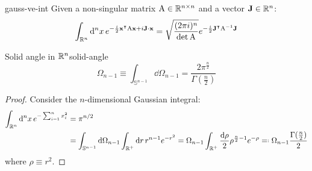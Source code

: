 \begin{lemma}{}{gauss-ve-int}
  Given a non-singular matrix $ \mathrm{A} \in \mathbb{R}^{n \times n} $ and a vector $ \mathbf{J} \in \mathbb{R}^n $:
  \begin{equation}
    \int_{\mathbb{R}^n} \mathrm{d}^nx\, e^{-\frac{i}{2} \mathbf{x}^\intercal \mathrm{A} \mathbf{x} + i \mathbf{J} \cdot \mathbf{x}} = \sqrt{\frac{(2\pi i)^n}{\det\mathrm{A}}} e^{-\frac{i}{2} \mathbf{J}^\intercal \mathrm{A}^{-1} \mathbf{J}}
  \end{equation}
\end{lemma}

\begin{proposition}[before upper = {\tcbtitle}]{Solid angle in $ \mathbb{R}^n $}{solid-angle}
  \begin{equation}
    \Omega_{n-1} \equiv \int_{\mathbb{S}^{n-1}} \dd \Omega_{n-1} = \frac{2\pi^{\frac{n}{2}}}{\Gamma(\frac{n}{2})}
    \label{eq:solid-angle}
  \end{equation}
\end{proposition}

\begin{proofbox}
  \begin{proof}
    Consider the $ n $-dimensional Gaussian integral:
    \begin{equation*}
      \begin{split}
        \int_{\R^n} \dd^nx \, e^{- \sum_{i = 1}^n x_i^2}
        & = \pi^{n/2} \\
        & = \int_{\mathbb{S}^{n-1}} \dd \Omega_{n-1} \int_{\R^+} \dd r \, r^{n - 1} e^{-r^2} = \Omega_{n-1} \int_{\R^+} \frac{\dd \rho}{2} \rho^{\frac{n}{2} - 1} e^{-\rho} \eqdef \Omega_{n-1} \frac{\Gamma(\frac{n}{2})}{2}
      \end{split}
    \end{equation*}
    where $ \rho \equiv r^2 $.
  \end{proof}
\end{proofbox}










